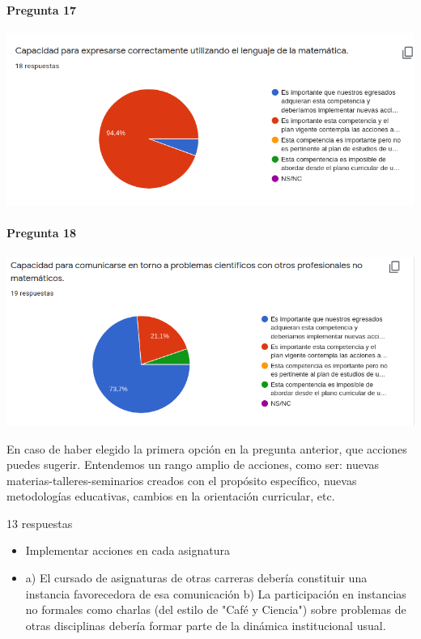 \documentclass[a4paper,10pt,BCOR10mm,oneside,headsepline]{scrbook}
\begin{document}
\begin{subappendices}
 
  
    \paragraph{Pregunta 17}
\begin{center}
 
\includegraphics[scale=.9]{doc17.png}
 \end{center}
 
 
     \paragraph{Pregunta 18}
\begin{center}
 
\includegraphics[scale=.9]{doc18.png}
 \end{center}
 
 
 En caso de haber elegido la primera opción en la pregunta anterior, que acciones puedes sugerir. Entendemos un rango amplio de acciones, como ser: nuevas materias-talleres-seminarios creados con el propósito específico, nuevas metodologías educativas, cambios en la orientación curricular, etc. 
 
 13 respuestas

 \begin{itemize} 
\item  Implementar acciones en cada asignatura

\item a) El cursado de asignaturas de otras carreras debería constituir una instancia favorecedora de esa comunicación b) La participación en instancias no formales como charlas (del estilo de "Café y Ciencia") sobre problemas de  otras disciplinas debería formar parte de la dinámica institucional usual.


\end{itemize}
\end{subappendices}
\end{document}
